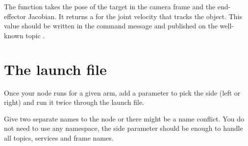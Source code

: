 \documentclass{ecnreport}
\begin{document}
The function  takes the pose of the target in the camera frame and the end-effector Jacobian. It returns a  for the joint velocity that tracks the object. This value should be written in the command message and published on the well-known topic .

\section{The launch file}

Once your node runs for a given arm, add a parameter to pick the side (left or right) and run it twice through the  launch file.

Give two separate names to the node or there might be a name conflict. You do not need to use any namespace, the side parameter should be enough to handle all topics, services and frame names.
\end{document}
